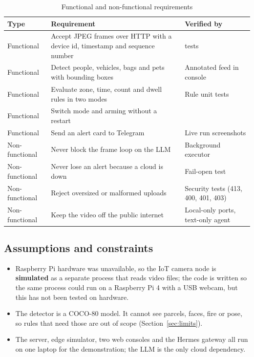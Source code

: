 \documentclass[11pt]{article}
\DeclareRobustCommand{\code}[1]{\texttt{\detokenize{#1}}}
\begin{document}
\begin{table}[H]
\centering\small
\caption{Functional and non-functional requirements}
\label{tab:ieee_4}
\begin{tabularx}{\textwidth}{|L{2.0cm}|Y|L{3.3cm}|}
\hline
{} \textbf{Type} & \textbf{Requirement} & \textbf{Verified by} \\ \hline
Functional & Accept JPEG frames over HTTP with a device id, timestamp and sequence number & \code{POST /frames} tests \\ \hline
Functional & Detect people, vehicles, bags and pets with bounding boxes & Annotated feed in console \\ \hline
Functional & Evaluate zone, time, count and dwell rules in two modes & Rule unit tests \\ \hline
Functional & Switch mode and arming without a restart & \code{GET/POST /mode} \\ \hline
Functional & Send an alert card to Telegram & Live run screenshots \\ \hline
Non-functional & Never block the frame loop on the LLM & Background executor \\ \hline
Non-functional & Never lose an alert because a cloud is down & Fail-open test \\ \hline
Non-functional & Reject oversized or malformed uploads & Security tests (413, 400, 401, 403) \\ \hline
Non-functional & Keep the video off the public internet & Local-only ports, text-only agent \\ \hline
\end{tabularx}
\end{table}

\subsection{Assumptions and constraints}

\begin{itemize}
  \item Raspberry Pi hardware was unavailable, so the IoT camera node is \textbf{simulated} as a separate process that reads video files; the code is written so the same process could run on a Raspberry Pi 4 with a USB webcam, but this has not been tested on hardware.
  \item The detector is a COCO-80 model. It cannot see parcels, faces, fire or pose, so rules that need those are out of scope (Section~\ref{sec:limits}).
  \item The server, edge simulator, two web consoles and the Hermes gateway all run on one laptop for the demonstration; the LLM is the only cloud dependency.
\end{itemize}
\end{document}
